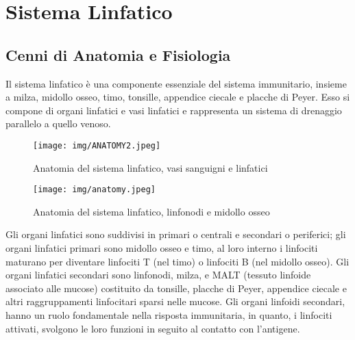 \chapter{Sistema Linfatico}

\section{Cenni di Anatomia e Fisiologia}
Il sistema linfatico \`e una componente essenziale del sistema immunitario, 
insieme a milza, midollo osseo, timo, tonsille, appendice ciecale e placche di Peyer. 
Esso si compone di organi linfatici e vasi linfatici e rappresenta 
un sistema di drenaggio parallelo a quello venoso\cite{BOOK1}.\\

\begin{figure}[h]
    \begin{center}
    \texttt{[image: img/ANATOMY2.jpeg]}
    \end{center}
    \caption[Anatomia del sistema linfatico, vasi sanguigni e linfatici]{Anatomia del sistema linfatico, vasi sanguigni e linfatici
    \cite{img1}}

\end{figure}

\begin{figure}[h]
    \begin{center}
    \texttt{[image: img/anatomy.jpeg]}
    \end{center}
    \caption[Anatomia del sistema linfatico, linfonodi e midollo osseo]{Anatomia del sistema linfatico, linfonodi e midollo osseo
    \cite{img2}}

\end{figure}


Gli organi linfatici sono suddivisi in primari o centrali 
e secondari o periferici; gli organi linfatici primari sono midollo osseo 
e timo, al loro interno i linfociti maturano per diventare linfociti T (nel timo) 
o linfociti B (nel midollo osseo). 
Gli organi linfatici secondari sono linfonodi, milza, e MALT 
(tessuto linfoide associato alle mucose) costituito da tonsille, 
placche di Peyer, appendice ciecale e altri raggruppamenti linfocitari 
sparsi nelle mucose. Gli organi linfoidi secondari, hanno un ruolo fondamentale 
nella risposta immunitaria, in quanto, i linfociti attivati, svolgono le loro funzioni 
in seguito al contatto con l'antigene\cite{BOOK1}.\\

